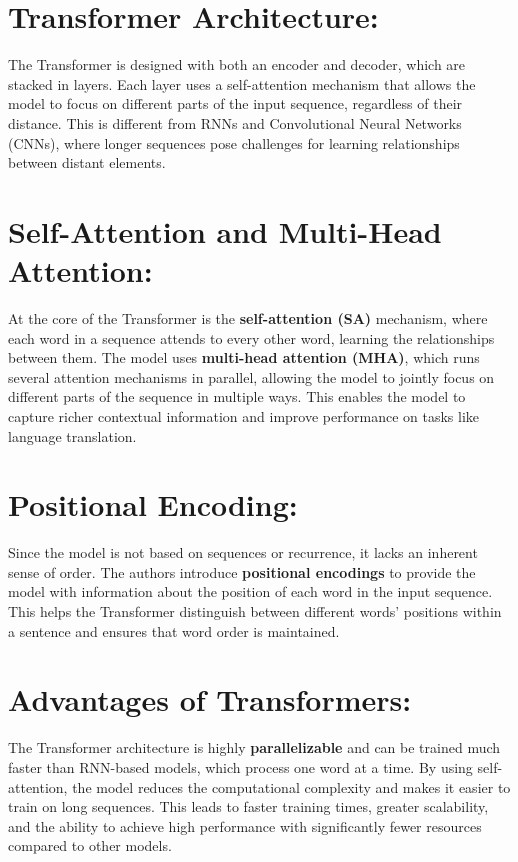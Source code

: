 \documentclass{report}
\begin{document}
	
	\section{Transformer Architecture:}
	The Transformer is designed with both an encoder and decoder, which are stacked in layers. Each layer uses a self-attention mechanism that allows the model to focus on different parts of the input sequence, regardless of their distance. This is different from RNNs and Convolutional Neural Networks (CNNs), where longer sequences pose challenges for learning relationships between distant elements.
	
	\section{Self-Attention and Multi-Head Attention:}
	At the core of the Transformer is the \textbf{self-attention (SA)} mechanism, where each word in a sequence attends to every other word, learning the relationships between them. The model uses \textbf{multi-head attention (MHA)}, which runs several attention mechanisms in parallel, allowing the model to jointly focus on different parts of the sequence in multiple ways. This enables the model to capture richer contextual information and improve performance on tasks like language translation.
	
	\section{Positional Encoding:}
	Since the model is not based on sequences or recurrence, it lacks an inherent sense of order. The authors introduce \textbf{positional encodings} to provide the model with information about the position of each word in the input sequence. This helps the Transformer distinguish between different words' positions within a sentence and ensures that word order is maintained.
	
	
	\section{Advantages of Transformers:}
	The Transformer architecture is highly \textbf{parallelizable} and can be trained much faster than RNN-based models, which process one word at a time. By using self-attention, the model reduces the computational complexity and makes it easier to train on long sequences. This leads to faster training times, greater scalability, and the ability to achieve high performance with significantly fewer resources compared to other models.
	
\end{document}
